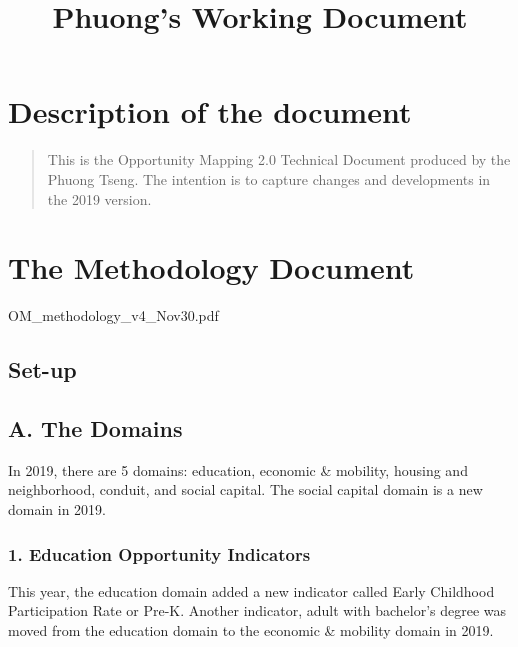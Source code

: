 \documentclass[]{article}
\title{Phuong's Working Document}
\author{}
\date{}
\begin{document}
\maketitle

{
\setcounter{tocdepth}{2}
\tableofcontents
}
\section{Description of the document}\label{description-of-the-document}

\begin{quote}
This is the Opportunity Mapping 2.0 Technical Document produced by the
Phuong Tseng. The intention is to capture changes and developments in
the 2019 version.
\end{quote}

\section{The Methodology Document}\label{the-methodology-document}

OM\_methodology\_v4\_Nov30.pdf

\subsection{Set-up}\label{set-up}

\subsection{A. The Domains}\label{a.-the-domains}

In 2019, there are 5 domains: education, economic \& mobility, housing
and neighborhood, conduit, and social capital. The social capital domain
is a new domain in 2019.

\subsubsection{1. Education Opportunity
Indicators}\label{education-opportunity-indicators}

This year, the education domain added a new indicator called Early
Childhood Participation Rate or Pre-K. Another indicator, adult with
bachelor's degree was moved from the education domain to the economic \&
mobility domain in 2019.
\end{document}
